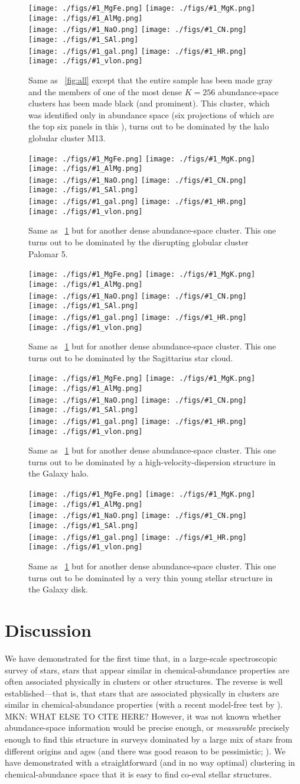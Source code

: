 \documentclass[12pt, letterpaper, preprint]{aastex}
\newlength{\figwidth}\setlength{\figwidth}{0.3\textwidth}
\newcommand{\insanefigure}[1]{%
\texttt{[image: ./figs/\#1\_MgFe.png]}%
\texttt{[image: ./figs/\#1\_MgK.png]}%
\texttt{[image: ./figs/\#1\_AlMg.png]}\\
\texttt{[image: ./figs/\#1\_NaO.png]}%
\texttt{[image: ./figs/\#1\_CN.png]}%
\texttt{[image: ./figs/\#1\_SAl.png]}\\
\texttt{[image: ./figs/\#1\_gal.png]}%
\texttt{[image: ./figs/\#1\_HR.png]}\\
\texttt{[image: ./figs/\#1\_vlon.png]}}
\begin{document}
\begin{figure}[!p]
\insanefigure{cluster_0256_0253}
\caption{Same as \figurename~\ref{fig:all} except that the entire
  sample has been made gray and the members of one of the most dense
  $K=256$ abundance-space clusters has been made black (and prominent).
  This cluster, which was identified only in abundance space (six
  projections of which are the top six panels in this \figurename),
  turns out to be dominated by the halo globular cluster
  M13.\label{fig:M13}}
\end{figure}
\begin{figure}[!p]
\insanefigure{cluster_0256_0034}
\caption{Same as \figurename~\ref{fig:M13} but for another dense
  abundance-space cluster.
  This one turns out to be dominated by the disrupting globular
  cluster Palomar 5.\label{fig:Pal5}}
\end{figure}
\begin{figure}[!p]
\insanefigure{cluster_0256_0177}
\caption{Same as \figurename~\ref{fig:M13} but for another dense
  abundance-space cluster.
  This one turns out to be dominated by the Sagittarius star
  cloud.\label{fig:Sgr}}
\end{figure}
\begin{figure}[!p]
\insanefigure{cluster_0256_0010}
\caption{Same as \figurename~\ref{fig:M13} but for another dense
  abundance-space cluster.
  This one turns out to be dominated by a high-velocity-dispersion
  structure in the Galaxy halo.\label{fig:halo}}
\end{figure}
\begin{figure}[!p]
\insanefigure{cluster_0256_0141}
\caption{Same as \figurename~\ref{fig:M13} but for another dense
  abundance-space cluster.
  This one turns out to be dominated by a very thin young stellar
  structure in the Galaxy disk.\label{fig:disk}}
\end{figure}

\clearpage
\section{Discussion}

We have demonstrated for the first time that, in a large-scale
spectroscopic survey of stars, stars that appear similar in
chemical-abundance properties are often associated physically in
clusters or other structures.
The reverse is well established---that is, that stars that are
associated physically in clusters are similar in chemical-abundance
properties (with a recent model-free test by \citealt{bovy}).
MKN: WHAT ELSE TO CITE HERE?
However, it was not known whether abundance-space information would be
precise enough, or \emph{measurable} precisely enough to find this
structure in surveys dominated by a large mix of stars from different
origins and ages (and there was good reason to be pessimistic;
\citealt{ting}).
We have demonstrated with a straightforward (and in no way optimal)
clustering in chemical-abundance space that it is easy to find co-eval
stellar structures.
\end{document}
